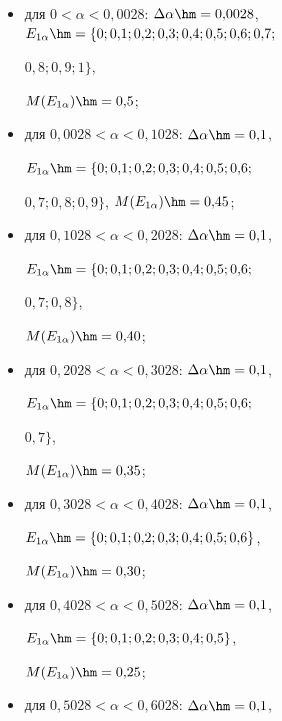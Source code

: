  \begin{itemize}

\item для $0<\alpha< 0{,}0028$: $\Delta\alpha\hm= 0{,}0028$, $E_{1\alpha}\hm=\{0; 

0{,}1; 0{,}2; 0{,}3; 0{,}4; 0{,}5; 0{,}6; 0{,}7;$\linebreak

$0{,}8; 0{,}9; 1\}$, 

$M(E_{1\alpha})\hm=0{,}5$; 

\item для $0{,}0028<\alpha<0{,}1028$: $\Delta\alpha \hm= 0{,}1$, 

$E_{1\alpha}\hm=\{0; 0{,}1; 0{,}2; 0{,}3; 0{,}4; 0{,}5; 0{,}6;$\linebreak

$0{,}7; 0{,}8; 

0{,}9\}$, $M(E_{1\alpha}) \hm=0{,}45$; 

\item для $0{,}1028 < \alpha<0{,}2028$: $\Delta\alpha\hm= 0{,}1$, 

$E_{1\alpha}\hm=\{0; 0{,}1; 0{,}2; 0{,}3; 0{,}4; 0{,}5; 0{,}6;$\linebreak

$0{,}7; 0{,}8\}$, 

$M(E_{1\alpha})\hm= 0{,}40$; 

\item для $0{,}2028 <\alpha< 0{,}3028$: $\Delta\alpha\hm=0{,}1$, 

$E_{1\alpha}\hm=\{0; 0{,}1; 0{,}2; 0{,}3; 0{,}4; 0{,}5; 0{,}6;$\linebreak

$0{,}7\}$, 

$M(E_{1\alpha})\hm= 0{,}35$; 

\item для $0{,}3028 <\alpha < 0{,}4028$: $\Delta\alpha\hm= 0{,}1$, 

$E_{1\alpha}\hm= \{0; 0{,}1; 0{,}2; 0{,}3; 0{,}4; 0{,}5; 0{,}6\}$, 

$M(E_{1\alpha})\hm= 0{,}30$; 

\item для $0{,}4028 <\alpha < 0{,}5028$: $\Delta\alpha\hm= 0{,}1$, 

$E_{1\alpha}\hm=\{0; 0{,}1; 0{,}2; 0{,}3; 0{,}4; 0{,}5\}$, 

$M(E_{1\alpha})\hm= 0{,}25$; 

\item для $0{,}5028 < \alpha<0{,}6028$: $\Delta\alpha\hm= 0{,}1$, 


\end{itemize}
